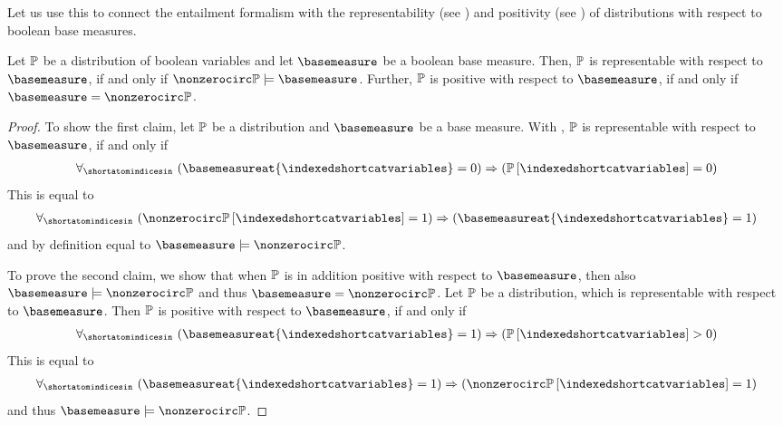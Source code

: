 Let us use this to connect the entailment formalism with the representability (see ) and positivity (see ) of distributions with respect to boolean base measures.

\begin{theorem}
    \label{the:minimalRepPosBaseMeasure}
    Let $\mathbb{P}$ be a distribution of boolean variables and let $\basemeasure$ be a boolean base measure.
    Then, $\mathbb{P}$ is representable with respect to $\basemeasure$, if and only if $\nonzerocirc\probtensor\models\basemeasure$.
    Further, $\mathbb{P}$ is positive with respect to $\basemeasure$, if and only if $\basemeasure=\nonzerocirc\probtensor$.
\end{theorem}
\begin{proof}
    To show the first claim, let $\mathbb{P}$ be a distribution and $\basemeasure$ be a base measure.
    With , $\mathbb{P}$ is representable with respect to $\basemeasure$, if and only if
    \begin{align*}
        \uniquantwrtof{\shortatomindicesin}{\imppremhead{\basemeasureat{\indexedshortcatvariables}=0}{\probat{\indexedshortcatvariables}=0}}
    \end{align*}
    This is equal to
    \begin{align*}
        \uniquantwrtof{\shortatomindicesin}{\imppremhead{\nonzerocirc\probat{\indexedshortcatvariables}=1}{\basemeasureat{\indexedshortcatvariables}=1}}
    \end{align*}
    and by definition  equal to $\basemeasure\models\nonzerocirc\probtensor$.

    To prove the second claim, we show that when $\mathbb{P}$ is in addition positive with respect to $\basemeasure$, then also $\basemeasure\models\nonzerocirc\probtensor$ and thus $\basemeasure=\nonzerocirc\probtensor$.
    Let $\mathbb{P}$ be a distribution, which is representable with respect to $\basemeasure$.
    Then $\mathbb{P}$ is positive with respect to $\basemeasure$, if and only if
    \begin{align*}
        \uniquantwrtof{\shortatomindicesin}{\imppremhead{\basemeasureat{\indexedshortcatvariables}=1}{\probat{\indexedshortcatvariables}>0}}
    \end{align*}
    This is equal to
    \begin{align*}
        \uniquantwrtof{\shortatomindicesin}{\imppremhead{\basemeasureat{\indexedshortcatvariables}=1}{\nonzerocirc\probat{\indexedshortcatvariables}=1}}
    \end{align*}
    and thus $\basemeasure\models\nonzerocirc\probtensor$.
\end{proof}

